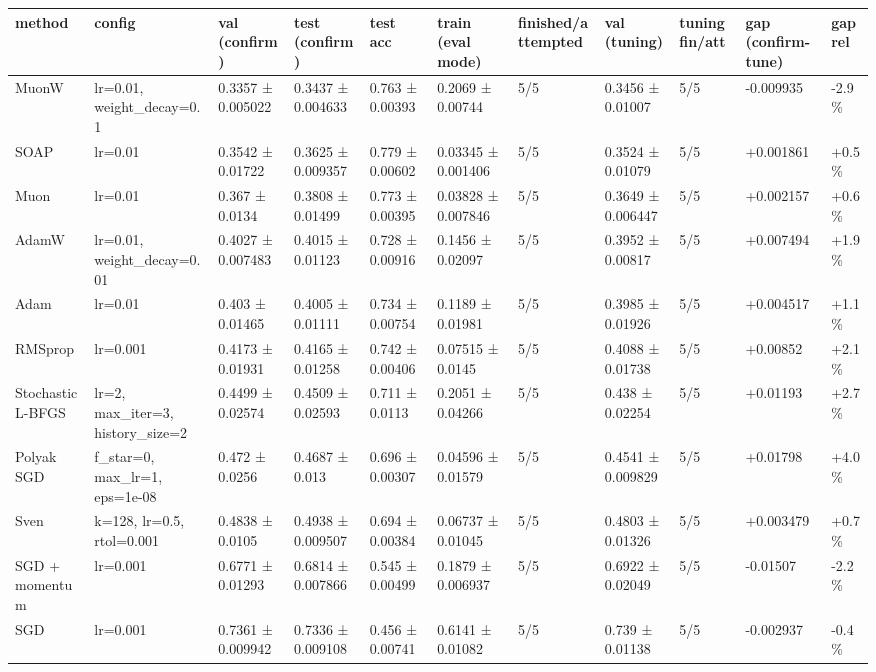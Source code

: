 \begin{tabular}{lllllllllll}
\toprule
method & config & val (confirm) & test (confirm) & test acc & train (eval mode) & finished/attempted & val (tuning) & tuning fin/att & gap (confirm-tune) & gap rel \\
\midrule
MuonW & lr=0.01, weight\_decay=0.1 & 0.3357 ± 0.005022 & 0.3437 ± 0.004633 & 0.763 ± 0.00393 & 0.2069 ± 0.00744 & 5/5 & 0.3456 ± 0.01007 & 5/5 & -0.009935 & -2.9\% \\
SOAP & lr=0.01 & 0.3542 ± 0.01722 & 0.3625 ± 0.009357 & 0.779 ± 0.00602 & 0.03345 ± 0.001406 & 5/5 & 0.3524 ± 0.01079 & 5/5 & +0.001861 & +0.5\% \\
Muon & lr=0.01 & 0.367 ± 0.0134 & 0.3808 ± 0.01499 & 0.773 ± 0.00395 & 0.03828 ± 0.007846 & 5/5 & 0.3649 ± 0.006447 & 5/5 & +0.002157 & +0.6\% \\
AdamW & lr=0.01, weight\_decay=0.01 & 0.4027 ± 0.007483 & 0.4015 ± 0.01123 & 0.728 ± 0.00916 & 0.1456 ± 0.02097 & 5/5 & 0.3952 ± 0.00817 & 5/5 & +0.007494 & +1.9\% \\
Adam & lr=0.01 & 0.403 ± 0.01465 & 0.4005 ± 0.01111 & 0.734 ± 0.00754 & 0.1189 ± 0.01981 & 5/5 & 0.3985 ± 0.01926 & 5/5 & +0.004517 & +1.1\% \\
RMSprop & lr=0.001 & 0.4173 ± 0.01931 & 0.4165 ± 0.01258 & 0.742 ± 0.00406 & 0.07515 ± 0.0145 & 5/5 & 0.4088 ± 0.01738 & 5/5 & +0.00852 & +2.1\% \\
Stochastic L-BFGS & lr=2, max\_iter=3, history\_size=2 & 0.4499 ± 0.02574 & 0.4509 ± 0.02593 & 0.711 ± 0.0113 & 0.2051 ± 0.04266 & 5/5 & 0.438 ± 0.02254 & 5/5 & +0.01193 & +2.7\% \\
Polyak SGD & f\_star=0, max\_lr=1, eps=1e-08 & 0.472 ± 0.0256 & 0.4687 ± 0.013 & 0.696 ± 0.00307 & 0.04596 ± 0.01579 & 5/5 & 0.4541 ± 0.009829 & 5/5 & +0.01798 & +4.0\% \\
Sven & k=128, lr=0.5, rtol=0.001 & 0.4838 ± 0.0105 & 0.4938 ± 0.009507 & 0.694 ± 0.00384 & 0.06737 ± 0.01045 & 5/5 & 0.4803 ± 0.01326 & 5/5 & +0.003479 & +0.7\% \\
SGD + momentum & lr=0.001 & 0.6771 ± 0.01293 & 0.6814 ± 0.007866 & 0.545 ± 0.00499 & 0.1879 ± 0.006937 & 5/5 & 0.6922 ± 0.02049 & 5/5 & -0.01507 & -2.2\% \\
SGD & lr=0.001 & 0.7361 ± 0.009942 & 0.7336 ± 0.009108 & 0.456 ± 0.00741 & 0.6141 ± 0.01082 & 5/5 & 0.739 ± 0.01138 & 5/5 & -0.002937 & -0.4\% \\
\bottomrule
\end{tabular}
